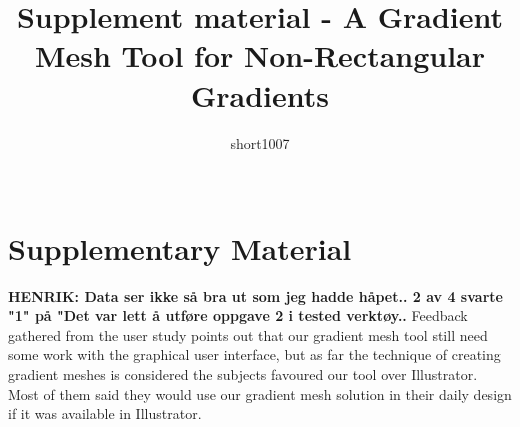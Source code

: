 \documentclass{egpubl}
\title[Supplement for a Non-rectangular gradient mesh tool]
	{Supplement material - A Gradient Mesh Tool for Non-Rectangular Gradients}
\author[short1007]
{\parbox{\textwidth}{\centering short1007}
        \\
	{\parbox{\textwidth}{\centering } }
}
\newcommand{\note}[3]{{\color{#2}\textbf{#1: #3}}}
\newcommand{\henrik}[1]{\note{HENRIK}{WildStrawberry}{#1}}
\begin{document}

\maketitle

\section{Supplementary Material}
\label{sec:intro}


\henrik{Data ser ikke så bra ut som jeg hadde håpet.. 2 av 4 svarte "1"  på  "Det var lett å utføre oppgave 2 i tested verktøy..}
Feedback gathered from the user study points out that our gradient mesh tool still need some work with the graphical user interface, but as far the technique of creating gradient meshes is considered the subjects favoured our tool over Illustrator. Most of them said they would use our gradient mesh solution in their daily design if it was available in Illustrator.
\end{document}

